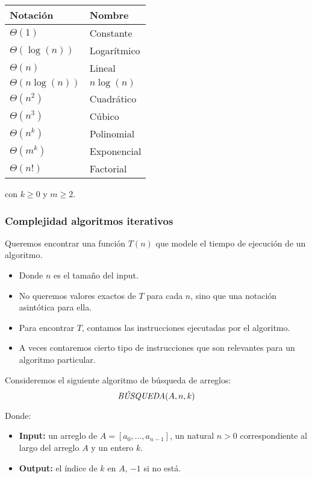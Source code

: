 \begin{multicols}{2}
    \begin{table}[H]
        \begin{tabular}{l|l}
         Notación & Nombre  \\
         \hline
         $\Theta(1)$ & Constante \\
         $\Theta(\log(n))$ & Logarítmico  \\
         $\Theta(n)$ & Lineal  \\
         $\Theta(n \log(n))$ & $n \log(n)$  \\
         $\Theta(n^2)$ & Cuadrático  \\
         $\Theta(n^3)$ & Cúbico  \\
         $\Theta(n^k)$ & Polinomial \\
         $\Theta(m^k)$ & Exponencial \\
         $\Theta(n!)$ & Factorial 
        \end{tabular}
        \end{table}
    
    con $k \geq 0$ y $m \geq 2$.
    
    \subsubsection*{Complejidad algoritmos iterativos}
    Queremos encontrar una función $T(n)$ que modele el tiempo de ejecución de un algoritmo.
    \begin{itemize}
        \item Donde $n$ es el tamaño del input.
        \item No queremos valores exactos de $T$ para cada $n$, sino que una notación asintótica para ella.
        \item Para encontrar $T$, contamos las instrucciones ejecutadas por el algoritmo.
        \item A veces contaremos cierto tipo de instrucciones que son relevantes para un algoritmo particular.
    \end{itemize}
    
    Consideremos el siguiente algoritmo de búsqueda de arreglos:
    $$
    \text{\textit{BÚSQUEDA}}(A,n,k)
    $$
    
    Donde:
    \begin{itemize}
        \item \textbf{Input:} un arreglo de $A = [a_0, \ldots, a_{n-1}]$, un natural $n > 0$ correspondiente al largo del arreglo $A$ y un entero $k$.
        \item \textbf{Output:} el índice de $k$ en $A$, $-1$ si no está.
    \end{itemize}
    

\end{multicols}
